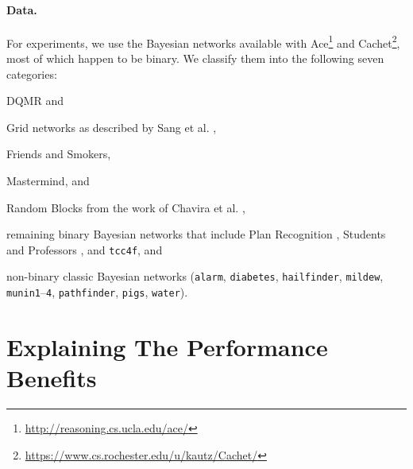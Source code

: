 \documentclass{article}
\theoremstyle{definition}
\theoremstyle{remark}
\begin{document}
\paragraph{Data.} For experiments, we use the Bayesian networks available
with Ace\footnote{\url{http://reasoning.cs.ucla.edu/ace/}} and
Cachet\footnote{\url{https://www.cs.rochester.edu/u/kautz/Cachet/}}, most of
which happen to be binary. We classify them into the following seven categories:
\begin{itemize*}
\item DQMR and
\item Grid networks as described by Sang et al. \cite{DBLP:conf/aaai/SangBK05},
\item Friends and Smokers,
\item Mastermind, and
\item Random Blocks from the work of Chavira et al.
  \cite{DBLP:journals/ijar/ChaviraDJ06},
\item remaining binary Bayesian networks that include Plan Recognition
  \cite{DBLP:conf/aaai/SangBK05}, Students and Professors
  \cite{DBLP:journals/ijar/ChaviraDJ06}, and \texttt{tcc4f}, and
\item non-binary classic Bayesian networks (\texttt{alarm}, \texttt{diabetes},
  \texttt{hailfinder}, \texttt{mildew}, \texttt{munin1}--\texttt{4},
  \texttt{pathfinder}, \texttt{pigs}, \texttt{water}).
\end{itemize*}

\section{Explaining The Performance Benefits}
\end{document}
